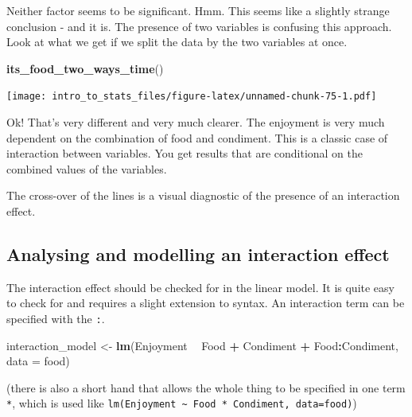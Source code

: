 \documentclass[
]{book}
\newenvironment{Shaded}{\begin{snugshade}}{\end{snugshade}}
\newcommand{\DataTypeTok}[1]{\textcolor[rgb]{0.13,0.29,0.53}{#1}}
\newcommand{\KeywordTok}[1]{\textcolor[rgb]{0.13,0.29,0.53}{\textbf{#1}}}
\newcommand{\NormalTok}[1]{#1}
\newcommand{\OperatorTok}[1]{\textcolor[rgb]{0.81,0.36,0.00}{\textbf{#1}}}
\newcommand{\StringTok}[1]{\textcolor[rgb]{0.31,0.60,0.02}{#1}}
\newenvironment{sidenote}
{ \begin{tcolorbox}[colbacktitle=blue!50!white,
title=huh?,coltitle=white,
fonttitle=\bfseries] }
{  \end{tcolorbox} }
\begin{document}
Neither factor seems to be significant. Hmm. This seems like a slightly strange conclusion - and it is. The presence of two variables is confusing this approach. Look at what we get if we split the data by the two variables at once.

\begin{Shaded}
\begin{Highlighting}[]
\KeywordTok{its_food_two_ways_time}\NormalTok{()}
\end{Highlighting}
\end{Shaded}

\texttt{[image: intro\_to\_stats\_files/figure-latex/unnamed-chunk-75-1.pdf]}

Ok! That's very different and very much clearer. The enjoyment is very much dependent on the combination of food and condiment. This is a classic case of interaction between variables. You get results that are conditional on the combined values of the variables.

\begin{sidenote}
The cross-over of the lines is a visual diagnostic of the presence of an interaction effect.
\end{sidenote}

\hypertarget{analysing-and-modelling-an-interaction-effect}{%
\subsection{Analysing and modelling an interaction effect}\label{analysing-and-modelling-an-interaction-effect}}

The interaction effect should be checked for in the linear model. It is quite easy to check for and requires a slight extension to syntax. An interaction term can be specified with the \texttt{:}.

\begin{Shaded}
\begin{Highlighting}[]
\NormalTok{interaction_model <-}\StringTok{ }\KeywordTok{lm}\NormalTok{(Enjoyment }\OperatorTok{~}\StringTok{ }\NormalTok{Food }\OperatorTok{+}\StringTok{ }\NormalTok{Condiment }\OperatorTok{+}\StringTok{ }\NormalTok{Food}\OperatorTok{:}\NormalTok{Condiment, }\DataTypeTok{data =}\NormalTok{ food)}
\end{Highlighting}
\end{Shaded}

(there is also a short hand that allows the whole thing to be specified in one term \texttt{*}, which is used like \texttt{lm(Enjoyment\ \textasciitilde{}\ Food\ *\ Condiment,\ data=food)})
\end{document}
